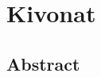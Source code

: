 \chapter*{Kivonat}%


\vfill

\begin{otherlanguage}{english}
\chapter*{Abstract}%


\end{otherlanguage}
\vfill

